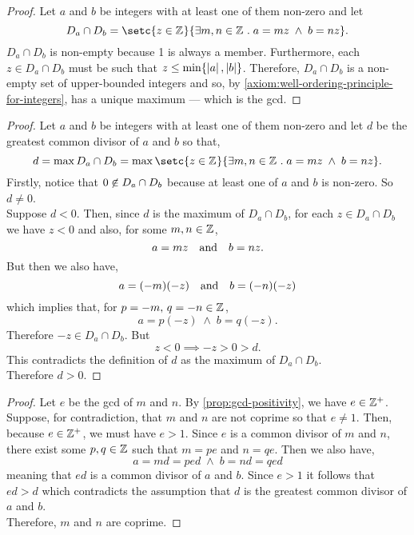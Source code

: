 \documentclass[../MathsNotesBase.tex]{subfiles}
\begin{document}
{		\biggerskip
		\begin{proof}
			Let $a$ and $b$ be integers with at least one of them non-zero and let
			\[ D_a \cap D_b = \setc{z \in \Z{}}{\exists m,n \in \Z{} \logicsep a = mz \; \land \; b = nz}. \]
			$D_a \cap D_b$ is non-empty because 1 is always a member. Furthermore, each ${ z \in D_a \cap D_b }$ must be such that ${ z \leq \min \{ \left\lvert a\right\rvert, \left\lvert b\right\rvert \} }$. Therefore, $D_a \cap D_b$ is a non-empty set of upper-bounded integers and so, by \autoref{axiom:well-ordering-principle-for-integers}, has a unique maximum --- which is the gcd.
		\end{proof}
	
		\bigskip
		\begin{proof}
			Let $a$ and $b$ be integers with at least one of them non-zero and let $d$ be the greatest common divisor of $a$ and $b$ so that,
			\[ d = \max D_a \cap D_b = \max \setc{z \in \Z{}}{\exists m,n \in \Z{} \logicsep a = mz \; \land \; b = nz}. \]
			Firstly, notice that ${ 0 \centernot\in D_a \cap D_b }$ because at least one of $a$ and $b$ is non-zero. So ${ d \neq 0 }$.\\
			
			Suppose ${ d < 0 }$. Then, since $d$ is the maximum of ${ D_a \cap D_b }$, for each ${ z \in D_a \cap D_b }$ we have ${ z < 0 }$ and also, for some ${ m,n \in \mathbb{Z}^{} }$,
			\[ a = mz \hspace{10pt}\text{and}\hspace{10pt} b = nz. \]
			But then we also have,
			\[  a = (-m)(-z) \hspace{10pt}\text{and}\hspace{10pt} b = (-n)(-z) \]
			which implies that, for ${ p = -m,\, q = -n \in \mathbb{Z}^{} }$,
			\[ a = p(-z) \; \land \; b = q(-z). \]
			Therefore ${ -z \in D_a \cap D_b }$. But 
			\[ z < 0 \implies -z > 0 > d. \]
			This contradicts the definition of $d$ as the maximum of ${ D_a \cap D_b }$.\\
			
			Therefore ${ d > 0 }$.
		\end{proof}
	
		\bigskip
		\begin{proof}
			Let $e$ be the gcd of $m$ and $n$. By \autoref{prop:gcd-positivity}, we have ${ e \in \mathbb{Z}^{+} }$. Suppose, for contradiction, that $m$ and $n$ are not coprime so that ${ e \neq 1 }$. Then, because ${ e \in \mathbb{Z}^{+} }$, we must have ${ e > 1 }$. Since $e$ is a common divisor of $m$ and $n$, there exist some ${ p,q \in \mathbb{Z}^{} }$ such that ${ m = p e }$ and ${ n = q e }$. Then we also have,
			\[ a = md = p e d \; \land \; b = nd = q e d \]
			meaning that ${ e d }$ is a common divisor of $a$ and $b$. Since ${ e > 1 }$ it follows that ${ e d > d }$ which contradicts the assumption that $d$ is the greatest common divisor of $a$ and $b$.\\
			Therefore,  $m$ and $n$ are coprime. 
		\end{proof}
	
}
\end{document}
